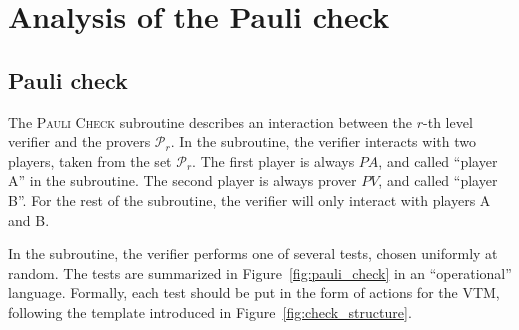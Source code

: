 \section{Analysis of the Pauli check}




\subsection{Pauli check}
\label{sec:pauli_check}

The \textsc{Pauli Check} subroutine describes an interaction between the $r$-th level verifier and the provers $\mathcal{P}_r$. In the subroutine, the verifier interacts with two players, taken from the set $\mathcal{P}_r$. The first player is always $PA$, and called ``player A'' in the subroutine. The second player is always prover $PV$, and called ``player B''. For the rest of the subroutine, the verifier will only interact with players A and B. 


In the subroutine, the verifier performs one of several tests, chosen uniformly at random. The tests are summarized in Figure~\ref{fig:pauli_check} in an ``operational'' language. Formally, each test should be put in the form of actions for the VTM, following the template introduced in Figure~\ref{fig:check_structure}. 

